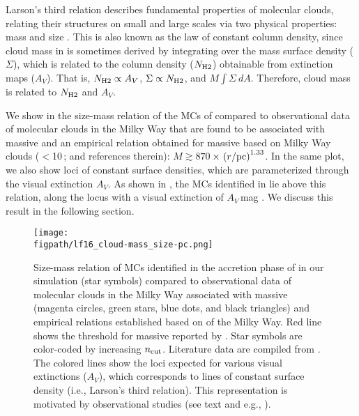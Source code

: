 \IfFileExists{emulateapjlegacy.cls}{\documentclass[iop]{emulateapjlegacy}}{\documentclass[iop]{emulateapj}}
\begin{document}
Larson's third relation describes fundamental properties of molecular clouds, relating their structures on small and large scales
via two physical properties: mass and size \citep{Larson81a, McKee07a}. This is also known as the law of constant column density,
since cloud mass in \obs is sometimes derived by integrating
over the mass surface density ($\Sigma$), which is related to the column density ($N_{\rm H2}$) obtainable from extinction maps ($A_V$).
That is, $N_{\rm H2}\propto A_V$, $\Sigma\propto N_{\rm H2}$, and $M$\eq$\int \Sigma~dA$.
Therefore, cloud mass is related to $N_{\rm H2}$ and $A_V$.

We show in  the size-mass relation of the MCs of \flower %
compared to
observational data of molecular clouds in the Milky Way that are found to be associated with massive \SF
\citep{Beuther02a, Mueller02a, Hill05a, Motte07a} and an empirical relation obtained for massive \SF based on
Milky Way clouds ($<$10\,\Msun; \citealt{Kauffmann10b, Kauffmann10c} and references therein): $M \gtrsim 870$\,\Msun$\times\,\left(r/{\rm pc}\right)^{1.33}$.
In the same plot, we also show loci of constant surface densities, which are parameterized through the visual extinction $A_V$.
As shown in , the MCs identified 
in \flower lie above this relation, along the locus
with a visual extinction of $A_V$\,mag \citep{Lombardi10a}.
We discuss this result in the following section.

\begin{figure*}[htbp]
\centering
\texttt{[image: \\figpath/lf16\_cloud-mass\_size-pc.png]}
\caption{
Size-mass relation of MCs identified in the accretion phase of \flower in our simulation (star symbols)
compared to observational data of molecular clouds in the Milky Way associated with massive \SF
(magenta circles, green stars, blue dots, and black triangles) and empirical relations
established based on \obs of the Milky Way.
Red line shows the threshold for massive \SF reported by \citet{Kauffmann10b}.
Star symbols are color-coded by increasing $n_{\rm cut}$.
Literature data are compiled from \citet{Beuther02a, Mueller02a, Hill05a, Motte07a}.
The colored lines show the loci expected for various visual extinctions ($A_V$), which corresponds to
lines of constant surface density (i.e., Larson's third relation). This representation is motivated by observational studies (see text and e.g., \citealt{Lombardi10a}).
\label{fig:MR}}
\end{figure*}
\end{document}
